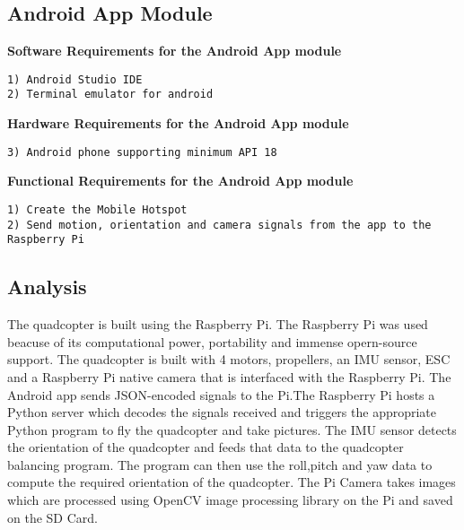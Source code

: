 \subsection{Android App Module}
\textbf{Software Requirements for the Android App module }
\begin{verbatim}
1) Android Studio IDE
2) Terminal emulator for android
\end{verbatim}
\textbf{Hardware Requirements for the Android App module}
\begin{verbatim}
3) Android phone supporting minimum API 18
\end{verbatim}
\textbf{Functional Requirements for the Android App module}
\begin{verbatim}
1) Create the Mobile Hotspot
2) Send motion, orientation and camera signals from the app to the Raspberry Pi
\end{verbatim}
\subsection{Analysis}
The quadcopter is built using the Raspberry Pi. The Raspberry Pi was used beacuse of its computational power, portability and immense opern-source support. The quadcopter is built with 4 motors, propellers, an IMU sensor, ESC and a Raspberry Pi native camera that is interfaced with the Raspberry Pi. The Android app sends JSON-encoded signals to the Pi.The Raspberry Pi hosts a Python server which decodes the signals received and triggers the appropriate Python program to fly the quadcopter and take pictures. The IMU sensor detects the orientation of the quadcopter and feeds that data to the quadcopter balancing program. The program can then use the roll,pitch and yaw data to compute the required orientation of the quadcopter. The Pi Camera takes images which are processed using OpenCV image processing library on the Pi and saved on the SD Card.
